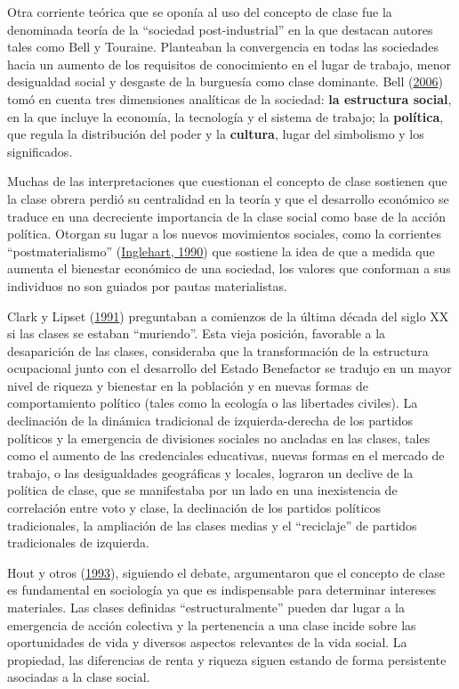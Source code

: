 \documentclass[
]{article}
\begin{document}
Otra corriente teórica que se oponía al uso del concepto de clase fue la denominada teoría de la ``sociedad post-industrial'' en la que destacan autores tales como Bell y Touraine. Planteaban la convergencia en todas las sociedades hacia un aumento de los requisitos de conocimiento en el lugar de trabajo, menor desigualdad social y desgaste de la burguesía como clase dominante. Bell (\protect\hyperlink{ref-Bell2006}{2006}) tomó en cuenta tres dimensiones analíticas de la sociedad: \textbf{la estructura social}, en la que incluye la economía, la tecnología y el sistema de trabajo; la \textbf{política}, que regula la distribución del poder y la \textbf{cultura}, lugar del simbolismo y los significados.

Muchas de las interpretaciones que cuestionan el concepto de clase sostienen que la clase obrera perdió su centralidad en la teoría y que el desarrollo económico se traduce en una decreciente importancia de la clase social como base de la acción política. Otorgan su lugar a los nuevos movimientos sociales, como la corrientes ``postmaterialismo'' (\protect\hyperlink{ref-Inglehart1990}{Inglehart, 1990}) que sostiene la idea de que a medida que aumenta el bienestar económico de una sociedad, los valores que conforman a sus individuos no son guiados por pautas materialistas.

Clark y Lipset (\protect\hyperlink{ref-Clark1991}{1991}) preguntaban a comienzos de la última década del siglo XX si las clases se estaban ``muriendo''. Esta vieja posición, favorable a la desaparición de las clases, consideraba que la transformación de la estructura ocupacional junto con el desarrollo del Estado Benefactor se tradujo en un mayor nivel de riqueza y bienestar en la población y en nuevas formas de comportamiento político (tales como la ecología o las libertades civiles). La declinación de la dinámica tradicional de izquierda-derecha de los partidos políticos y la emergencia de divisiones sociales no ancladas en las clases, tales como el aumento de las credenciales educativas, nuevas formas en el mercado de trabajo, o las desigualdades geográficas y locales, lograron un declive de la política de clase, que se manifestaba por un lado en una inexistencia de correlación entre voto y clase, la declinación de los partidos políticos tradicionales, la ampliación de las clases medias y el ``reciclaje'' de partidos tradicionales de izquierda.

Hout y otros (\protect\hyperlink{ref-Hout1993}{1993}), siguiendo el debate, argumentaron que el concepto de clase es fundamental en sociología ya que es indispensable para determinar intereses materiales. Las clases definidas ``estructuralmente'' pueden dar lugar a la emergencia de acción colectiva y la pertenencia a una clase incide sobre las oportunidades de vida y diversos aspectos relevantes de la vida social. La propiedad, las diferencias de renta y riqueza siguen estando de forma persistente asociadas a la clase social.
\end{document}
